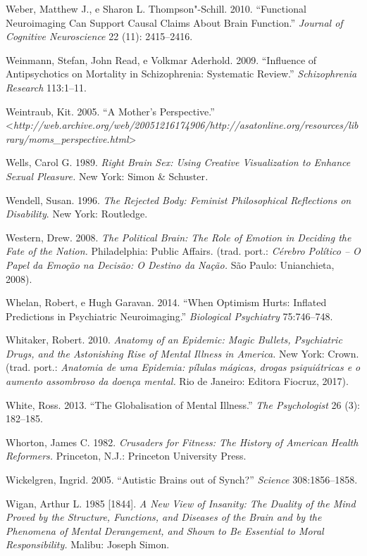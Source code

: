 Weber, Matthew J., e Sharon L. Thompson"-Schill. 2010. ``Functional
Neuroimaging Can Support Causal Claims About Brain Function.''
\emph{Journal of Cognitive Neuroscience} 22 (11): 2415--2416.

Weinmann, Stefan, John Read, e Volkmar Aderhold. 2009. ``Influence of
Antipsychotics on Mortality in Schizophrenia: Systematic Review.''
\emph{Schizophrenia Research} 113:1--11.

Weintraub, Kit. 2005. ``A Mother's Perspective.''
\textless{}\emph{http://web.archive.org/web/20051216174906/http://asatonline.org/resources/library/moms\_perspective.html}\textgreater{}

Wells, Carol G. 1989. \emph{Right Brain Sex: Using Creative
Visualization to Enhance Sexual Pleasure.} New York: Simon \&
Schuster\emph{. }

Wendell, Susan. 1996. \emph{The Rejected Body: Feminist Philosophical
Reflections on Disability}. New York: Routledge.

Western, Drew. 2008. \emph{The Political Brain: The Role of Emotion in
Deciding the Fate of the Nation.} Philadelphia: Public Affairs. (trad.
port.: \emph{Cérebro Político -- O Papel da Emoção na Decisão: O Destino
da Nação.} São Paulo: Unianchieta, 2008).

Whelan, Robert, e Hugh Garavan. 2014. ``When Optimism Hurts: Inflated
Predictions in Psychiatric Neuroimaging.'' \emph{Biological Psychiatry}
75:746--748.

Whitaker, Robert. 2010. \emph{Anatomy of an Epidemic: Magic Bullets,
Psychiatric Drugs, and the Astonishing Rise of Mental Illness in
America.} New York: Crown. (trad. port.: \emph{Anatomia de uma Epidemia:
pílulas mágicas, drogas psiquiátricas e o aumento assombroso da doença
mental.} Rio de Janeiro: Editora Fiocruz, 2017).

White, Ross. 2013. ``The Globalisation of Mental Illness.'' \emph{The
Psychologist} 26 (3): 182--185.

Whorton, James C. 1982. \emph{Crusaders for Fitness: The History of
American Health Reformers.} Princeton, N.J.: Princeton University Press.

Wickelgren, Ingrid. 2005. ``Autistic Brains out of Synch?''
\emph{Science} 308:1856--1858.

Wigan, Arthur L. 1985 {[}1844{]}. \emph{A New View of Insanity: The
Duality of the Mind Proved by the Structure, Functions, and Diseases of
the Brain and by the Phenomena of Mental Derangement, and Shown to Be
Essential to Moral Responsibility.} Malibu: Joseph Simon.

